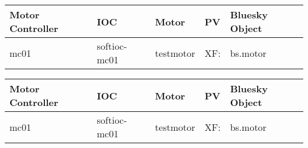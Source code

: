 \documentclass[letterpaper,10pt,english]{sphinxmanual}
\begin{document}
\begin{savenotes}\sphinxattablestart
\raggedright
{}
\sphinxthecaptionisattop
{}\label{\detokenize{staff:xf05ida-ioc1-motors}}
\sphinxaftertopcaption
\begin{tabulary}{\linewidth}[t]{|T|T|T|T|T|}
\hline
\sphinxstyletheadfamily 
Motor Controller
&\sphinxstyletheadfamily 
IOC
&\sphinxstyletheadfamily 
Motor
&\sphinxstyletheadfamily 
PV
&\sphinxstyletheadfamily 
Bluesky Object
\\
\hline
mc01
&
softioc-mc01
&
testmotor
&
XF:
&
bs.motor
\\
\hline
\end{tabulary}
\par
\sphinxattableend\end{savenotes}


\begin{savenotes}\sphinxattablestart
\raggedright
{}
\sphinxthecaptionisattop
{}\label{\detokenize{staff:xf05idd-ioc1-motors}}
\sphinxaftertopcaption
\begin{tabulary}{\linewidth}[t]{|T|T|T|T|T|}
\hline
\sphinxstyletheadfamily 
Motor Controller
&\sphinxstyletheadfamily 
IOC
&\sphinxstyletheadfamily 
Motor
&\sphinxstyletheadfamily 
PV
&\sphinxstyletheadfamily 
Bluesky Object
\\
\hline
mc01
&
softioc-mc01
&
testmotor
&
XF:
&
bs.motor
\\
\hline
\end{tabulary}
\par
\sphinxattableend\end{savenotes}
\end{document}

